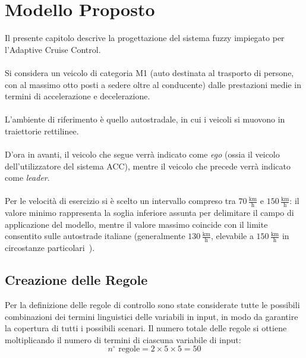 \chapter{Modello Proposto}

Il presente capitolo descrive la progettazione del sistema fuzzy impiegato per l'Adaptive Cruise Control.  
\\\\
Si considera un veicolo di categoria M1 (auto destinata al trasporto di persone, con al massimo otto posti a sedere oltre al conducente)
dalle prestazioni medie in termini di accelerazione e decelerazione.  
\\\\
L'ambiente di riferimento è quello autostradale, in cui i veicoli si muovono in traiettorie rettilinee.  
\\\\
D'ora in avanti, il veicolo che segue verrà indicato come \emph{ego} (ossia il veicolo dell'utilizzatore del sistema ACC), 
mentre il veicolo che precede verrà indicato come \emph{leader}.  
\\\\
Per le velocità di esercizio si è scelto un intervallo compreso tra \(70\,\text{$\frac{\mathrm{km}}{\mathrm{h}}$}\) e \(150\,\text{$\frac{\mathrm{km}}{\mathrm{h}}$}\): 
il valore minimo rappresenta la soglia inferiore assunta per delimitare il campo di applicazione del modello, 
mentre il valore massimo coincide con il limite consentito sulle autostrade italiane 
(generalmente \(130\,\text{$\frac{\mathrm{km}}{\mathrm{h}}$}\), elevabile 
a \(150\,\text{$\frac{\mathrm{km}}{\mathrm{h}}$}\) in circostanze particolari~\cite{limite_autostrada_150}).  
 
 



\section{Creazione delle Regole}
Per la definizione delle regole di controllo sono state considerate tutte le possibili combinazioni dei termini linguistici 
delle variabili in input, in modo da garantire la copertura di tutti i possibili scenari.  
Il numero totale delle regole si ottiene moltiplicando il numero di termini di ciascuna variabile di input:
\[
n^\circ \text{ regole} = 2 \times 5 \times 5 = 50
\]


